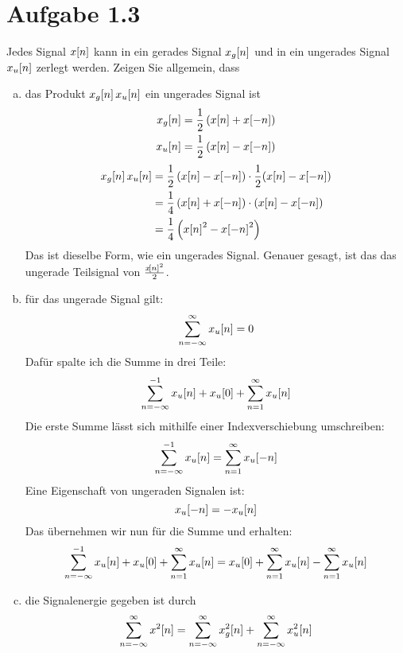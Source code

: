 \section*{Aufgabe 1.3}
Jedes Signal $x\negthinspace\left[n\right]$ kann in ein gerades Signal $x_g\negthinspace\left[n\right]$ und in ein ungerades Signal $x_u\negthinspace\left[n\right]$ zerlegt werden. Zeigen Sie allgemein, dass
	\begin{enumerate}[a)]
		\item das Produkt $x_g\negthinspace\left[n\right]x_u\negthinspace\left[n\right]$ ein ungerades Signal ist
			\begin{align*}
				x_g\negthinspace\left[n\right] &=\frac{1}{2}\left(x\negthinspace\left[n\right]+x\negthinspace\left[-n\right]\right)\\
				x_u\negthinspace\left[n\right] &=\frac{1}{2}\left(x\negthinspace\left[n\right]-x\negthinspace\left[-n\right]\right)
			\end{align*} \begin{align*}
				x_g\leftn[n\right] x_u\leftn[n\right]&=\frac{1}{2}\left(x\leftn[n\right]-x\leftn[-n\right]\right)\cdot \frac{1}{2}\leftn(x\leftn[n\right]-x\leftn[-n\right]\right)\\
				&=\frac{1}{4}\left(x\leftn[n\right]+x\leftn[-n\right]\right)\cdot \left(x\leftn[n\right]-x\leftn[-n\right]\right)\\
				&=\frac{1}{4}\left(x\leftn[n\right]^2-x\leftn[-n\right]^2\right)
			\end{align*}
			Das ist dieselbe Form, wie ein ungerades Signal. Genauer gesagt, ist das das ungerade Teilsignal von $\frac{x\negthinspace\left[n\right]^2}{2}$.
		\item für das ungerade Signal gilt:
		\[
			\sum_{n=-\infty}^{\infty}x_u\negthinspace\left[n\right]=0
		\]
		Dafür spalte ich die Summe in drei Teile:
		\[
			\sum_{n=-\infty}^{-1}x_u\negthinspace\left[n\right]+x_u\negthinspace\left[0\right]+\sum_{n=1}^{\infty}x_u\negthinspace\left[n\right]
		\]
		Die erste Summe lässt sich mithilfe einer Indexverschiebung umschreiben:
		\[
			\sum_{n=-\infty}^{-1}x_u\negthinspace\left[n\right]=\sum_{n=1}^{\infty}x_u\negthinspace\left[-n\right]
		\]
		Eine Eigenschaft von ungeraden Signalen ist:
		\[
			x_u\negthinspace\left[-n\right]=-x_u\negthinspace\left[n\right]
		\]
		Das übernehmen wir nun für die Summe und erhalten:
		\[
			\sum_{n=-\infty}^{-1}x_u\negthinspace\left[n\right]+x_u\negthinspace\left[0\right]+\sum_{n=1}^{\infty}x_u\negthinspace\left[n\right]=x_u\negthinspace\left[0\right]+\sum_{n=1}^{\infty}x_u\negthinspace\left[n\right]-\sum_{n=1}^{\infty}x_u\negthinspace\left[n\right]
		\]\clearpage
		\item die Signalenergie gegeben ist durch
		\[
			\sum_{n=-\infty}^{\infty}x^2\negthinspace\left[n\right]=\sum_{n=-\infty}^{\infty}x_g^2\negthinspace\left[n\right]+\sum_{n=-\infty}^{\infty}x_u^2\negthinspace\left[n\right]
\]
\end{enumerate}
